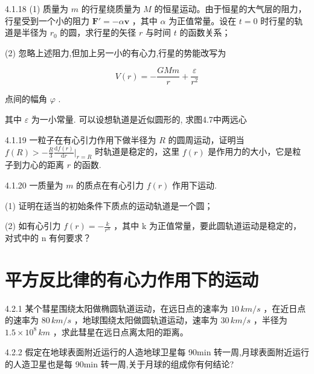 \begin{problem}{4.1.18}
(1) 质量为 $m$ 的行星绕质量为 $M$ 的恒星运动。由于恒星的大气层的阻力，行星受到一个小的阻力 $\bm{F}' = -\alpha \bm{v}$ ，其中 $\alpha$ 为正值常量。设在 $t = 0$ 时行星的轨道是半径为 $r_0$ 的圆，求行星的矢径 $r$ 与时间 $t$ 的函数关系；

(2) 忽略上述阻力,但加上另一小的有心力,行星的势能改写为

\[
V (r) = - \frac {G M m}{r} + \frac {\varepsilon}{r ^ {2}}
\]

点间的幅角 $\varphi$ .

其中 $\varepsilon$ 为一小常量. 可以设想轨道是近似圆形的, 求图4.7中两远心
\begin{center}

\end{center}
\end{problem}
\clearpage


\begin{problem}{4.1.19}
一粒子在有心引力作用下做半径为 $R$ 的圆周运动，证明当 $f(R) > -\frac{R}{3} \frac{\mathrm{d} f(r)}{\mathrm{d} r} \Bigg|_{r = R}$ 时轨道是稳定的，这里 $f(r)$ 是作用力的大小，它是粒子到力心的距离 $r$ 的函数.
\end{problem}
\clearpage


\begin{problem}{4.1.20}
一质量为 $m$ 的质点在有心引力 $f(r)$ 作用下运动.

(1) 证明在适当的初始条件下质点的运动轨道是一个圆；

(2) 如有心引力 $f(r) = -\frac{k}{r^{n}}$ ，其中 k 为正值常量，要此圆轨道运动是稳定的，对式中的 n 有何要求？
\end{problem}
\clearpage


\section{平方反比律的有心力作用下的运动}

\begin{problem}{4.2.1}
某个彗星围绕太阳做椭圆轨道运动，在远日点的速率为 $10 \, km/s$ ，在近日点的速率为 $80 \, km/s$ ，地球围绕太阳做圆轨道运动，速率为 $30 \, km/s$ ，半径为 $1.5 \times 10^{8} \, km$ ，求此彗星在远日点离太阳的距离。
\end{problem}
\clearpage


\begin{problem}{4.2.2}
假定在地球表面附近运行的人造地球卫星每 90min 转一周,月球表面附近运行的人造卫星也是每 90min 转一周,关于月球的组成你有何结论?
\end{problem}
\clearpage


